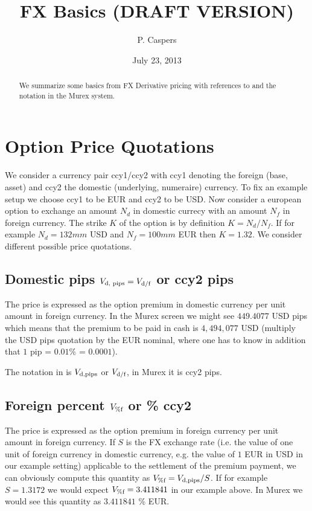 \documentclass{amsart}
\theoremstyle{plain}
\numberwithin{equation}{section}
\begin{document}
\title[FX Basics]{FX Basics (DRAFT VERSION)}
\author{P. Caspers}
\date{July 23, 2013}
\begin{abstract}
We summarize some basics from FX Derivative pricing with references to \cite{Clark} and the notation
in the Murex system.
\end{abstract}

\maketitle

\section{Option Price Quotations}

We consider a currency pair ccy1/ccy2 with ccy1 denoting the foreign (base, asset) and ccy2 the domestic (underlying, numeraire) currency. 
To fix an example setup we choose ccy1 to be EUR and ccy2 to be USD. Now consider a european option to exchange an amount $N_d$ in domestic
currecy with an amount $N_f$ in foreign currency. The strike $K$ of the option is by definition $K=N_d / N_f$. If for
example $N_d = 132mm$ USD and $N_f = 100mm$ EUR then $K = 1.32$. We consider different possible price quotations.

\subsection{Domestic pips $V_{\textnormal{d, pips}} = V_{\textnormal{d/f}}$ or ccy2 pips}

The price is expressed as the option premium in domestic currency per unit amount in foreign currency. In the Murex screen
we might see $449.4077$ USD pips which means that the premium to be paid in cash is $4,494,077$ USD (multiply the USD pips
quotation by the EUR nominal, where one has to know in addition that $1$ pip = $0.01\%$ = $0.0001$).

The notation in \cite{Clark} is $V_{\textnormal{d,pips}}$ or $V_{\textnormal{d/f}}$, in Murex it is ccy2 pips.

\subsection{Foreign percent $V_{\%\textnormal{f}}$ or \% ccy2}

The price is expressed as the option premium in foreign currency per unit amount in foreign currency. If $S$ is the
FX exchange rate (i.e. the value of one unit of foreign currency in domestic currency, e.g. the value of $1$ EUR in USD in
our example setting) applicable to the settlement of the premium payment, we can obviously compute this quantity as
$V_{\%\textnormal{f}} = V_{\textnormal{d,pips}} / S$. If for example $S = 1.3172$ we would expect $V_{\%\textnormal{f}} = 3.411841$ in our example above. In
Murex we would see this quantity as $3.411841$ \% EUR.
\end{document}
